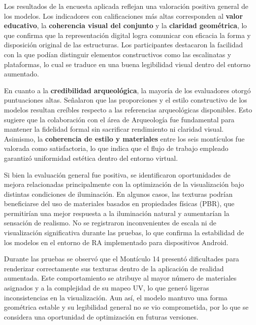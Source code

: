 
Los resultados de la encuesta aplicada reflejan una valoración positiva general de los modelos. Los indicadores con calificaciones más altas corresponden al \textbf{valor educativo}, la \textbf{coherencia visual del conjunto} y la \textbf{claridad geométrica}, lo que confirma que la representación digital logra comunicar con eficacia la forma y disposición original de las estructuras. Los participantes destacaron la facilidad con la que podían distinguir elementos constructivos como las escalinatas y plataformas, lo cual se traduce en una buena legibilidad visual dentro del entorno aumentado.

En cuanto a la \textbf{credibilidad arqueológica}, la mayoría de los evaluadores otorgó puntuaciones altas. Señalaron que las proporciones y el estilo constructivo de los modelos resultan creíbles respecto a las referencias arqueológicas disponibles. Esto sugiere que la colaboración con el área de Arqueología fue fundamental para mantener la fidelidad formal sin sacrificar rendimiento ni claridad visual. Asimismo, la \textbf{coherencia de estilo y materiales} entre los seis montículos fue valorada como satisfactoria, lo que indica que el flujo de trabajo empleado garantizó uniformidad estética dentro del entorno virtual.

Si bien la evaluación general fue positiva, se identificaron oportunidades de mejora relacionadas principalmente con la optimización de la visualización bajo distintas condiciones de iluminación. En algunos casos, las texturas podrían beneficiarse del uso de materiales basados en propiedades físicas (\gls{PBR}), que permitirían una mejor respuesta a la iluminación natural y aumentarían la sensación de realismo. No se registraron inconvenientes de escala ni de visualización significativa durante las pruebas, lo que confirma la estabilidad de los modelos en el entorno de RA implementado para dispositivos Android.

Durante las pruebas se observó que el Montículo 14 presentó dificultades para renderizar correctamente sus texturas dentro de la aplicación de realidad aumentada. Este comportamiento se atribuye al mayor número de materiales asignados y a la complejidad de su mapeo UV, lo que generó ligeras inconsistencias en la visualización. Aun así, el modelo mantuvo una forma geométrica estable y su legibilidad general no se vio comprometida, por lo que se considera una oportunidad de optimización en futuras versiones.

